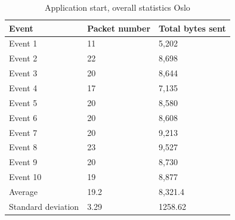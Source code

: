 \begin{table}[H]
\centering
\caption{Application start, overall statistics Oslo}
\label{tab:ASoverallOslo}
\begin{tabular}{|l|l|l|}
\hline
\textbf{Event} & \textbf{Packet number} & \textbf{Total bytes sent} \\ \hline
Event 1        & 11                     & 5,202                      \\ \hline
Event 2        & 22                     & 8,698                      \\ \hline
Event 3        & 20                     & 8,644                      \\ \hline
Event 4        & 17                     & 7,135                      \\ \hline
Event 5        & 20                     & 8,580                      \\ \hline
Event 6        & 20                     & 8,608                      \\ \hline
Event 7        & 20                     & 9,213                      \\ \hline
Event 8        & 23                     & 9,527                      \\ \hline
Event 9        & 20                     & 8,730                      \\ \hline
Event 10       & 19                     & 8,877                      \\ \hline
Average        & 19.2                   & 8,321.4                    \\ \hline
Standard deviation        & 3.29
       & 1258.62               \\ \hline
\end{tabular}
\end{table}

